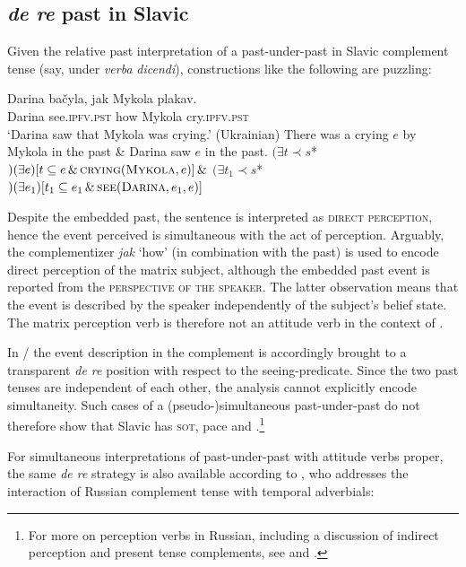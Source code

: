 \documentclass[output=paper,colorlinks,citecolor=brown]{langscibook}
\begin{document}
 \subsection{\textit{de re} past in Slavic}
Given the relative past interpretation of a past-under-past in Slavic complement tense (say, under \textit{verba} \textit{dicendi}), constructions like the following are puzzling:

\ea\ea\label{perc-ukr}\gll
Darina bačyla, jak Mykola plakav.\\
Darina see.\textsc{ipfv}.\textsc{pst} how Mykola cry.\textsc{ipfv}.\textsc{pst} \\
\glt `Darina saw that Mykola was crying.' \hfill (Ukrainian)
\ex\label{b} There was a crying $e$ by Mykola in the past \& Darina saw $e$ in the past. 
\ex \label{grs:78}
$(\exists t \prec s$*$)(\exists e)[t \subseteq e \, \& \,
 \textsc{crying}(\textsc{Mykola}, e)]\, \&$ \newline  $  (\exists t_{1} \prec s$*$)(\exists e_{1})[t_{1}  \subseteq e_{1} \, \& \,
 \textsc{see}(\textsc{Darina},e_{1},e)]$ \\ \hfill \citep{gronn_stechow2010}
\z\z

\noindent Despite the embedded past, the sentence is interpreted as \textsc{direct perception}, hence  the event perceived is simultaneous with the act of perception. 
Arguably, the complementizer {\textit{jak}} `how' (in combination with the past)  is used to encode  direct perception of the matrix subject, although the embedded past event is reported from the \textsc{perspective} \textsc{of the} \textsc{speaker}.
The latter observation means that the event is described by the speaker independently of the  subject's belief state. The matrix perception verb is therefore not an attitude verb in the context of .

In /
the event description in the complement is  accordingly brought to a transparent \textit{de re} position with respect to the seeing-predicate.
Since the two past tenses are independent of each other, the analysis cannot explicitly encode simultaneity. 
Such cases of a (pseudo-)simultaneous past-under-past do not therefore  show that Slavic has  \textsc{sot}, pace \citet{altshuler04} and \citet{Altshuler2008}.\footnote{For more on perception verbs in Russian, including a discussion of indirect perception and present tense complements, see \citet{Khomitsevich2007} and \citet{gronn23}.}

For simultaneous interpretations of past-under-past with attitude verbs proper, the same \textit{de re} strategy is also available according to \citet{vostrikova18}, who addresses the interaction of Russian complement tense with temporal adverbials:
\end{document}
